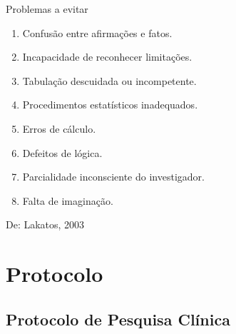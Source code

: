 \documentclass{beamer}
\begin{document}
\begin{frame}{Problemas a evitar}
  \begin{enumerate}
  \item Confusão entre afirmações e fatos. %
  \item Incapacidade de reconhecer limitações.%
  \item Tabulação descuidada ou incompetente. %
  \item Procedimentos estatísticos inadequados. %
  \item Erros de cálculo. %
  \item Defeitos de lógica.%
  \item Parcialidade inconsciente do investigador.%
  \item Falta de imaginação. %
  \end{enumerate}
  De: Lakatos, 2003
\end{frame}

\section{Protocolo}

\subsection{Protocolo de Pesquisa Clínica}
\end{document}

